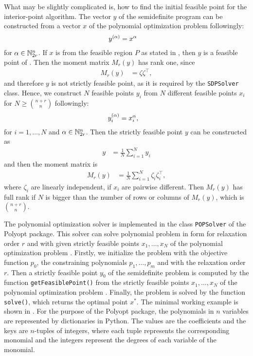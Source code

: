 What may be slightly complicated is, how to find the initial feasible point for the interior-point algorithm.
The vector $y$ of the semidefinite program  can be constructed from a vector $x$ of the polynomial optimization problem  followingly:
\begin{align}
  y^{(\alpha)} &= x^\alpha
\end{align}
for $\alpha \in \mathbb{N}^n_{2r}$.
If $x$ is from the feasible region $P$ as stated in , then $y$ is a feasible point of .
Then the moment matrix $M_r(y)$ has rank one, since
\begin{align}
  M_r(y) &= \zeta\zeta^\top,
\end{align}
and therefore $y$ is not strictly feasible point, as it is required by the \texttt{SDPSolver} class.
Hence, we construct $N$ feasible points $y_i$ from $N$ different feasible points $x_i$ for $N \geq {\binom{n+r}{n}}$ followingly:
\begin{align}
  y_i^{(\alpha)} &= x_i^\alpha,
\end{align}
for $i = 1,\ldots,N$ and $\alpha\in\mathbb{N}_{2r}^n$.
Then the strictly feasible point $y$ can be constructed as
\begin{align}
  y &= \frac{1}{N}\sum_{i=1}^Ny_i
\end{align}
and then the moment matrix is
\begin{align}
   M_r(y) &= \frac{1}{N} \sum_{i=1}^N \zeta_i\zeta_i^\top,
\end{align}
where $\zeta_i$ are linearly independent, if $x_i$ are pairwise different.
Then $M_r(y)$ has full rank if $N$ is bigger than the number of rows or columns of $M_r(y)$, which is ${\binom{n+r}{n}}$.

The polynomial optimization solver is implemented in the class \texttt{POPSolver} of the Polyopt package.
This solver can solve polynomial problem in form  for relaxation order $r$ and with given strictly feasible points $x_1, \ldots, x_N$ of the polynomial optimization problem .
Firstly, we initialize the problem with the objective function $p_0$, the constraining polynomials $p_1, \ldots, p_m$ and with the relaxation order $r$.
Then a strictly feasible point $y_0$ of the semidefinite problem is computed by the function \texttt{getFeasiblePoint()} from the strictly feasible points $x_1, \ldots, x_N$ of the polynomial optimization problem .
Finally, the problem is solved by the function \texttt{solve()}, which returns the optimal point $x^*$.
The minimal working example is shown in .
For the purpose of the Polyopt package, the polynomials in $n$ variables are represented by dictionaries in Python.
The values are the coefficients and the keys are $n$-tuples of integers, where each tuple represents the corresponding monomial and the integers represent the degrees of each variable of the monomial.


